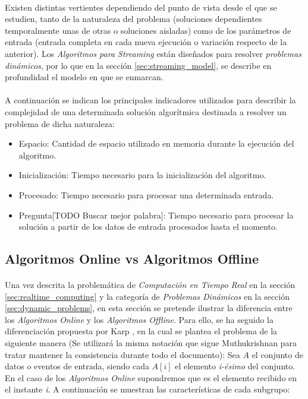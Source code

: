 \documentclass{subfiles}
\begin{document}
        \paragraph{}
        Existen distintas vertientes dependiendo del punto de vista desde el que se estudien, tanto de la naturaleza del problema (soluciones dependientes temporalmente unas de otras o soluciones aisladas) como de los parámetros de entrada (entrada completa en cada nueva ejecución o variación respecto de la anterior). Los \emph{Algoritmos para Streaming} están diseñados para resolver \emph{problemas dinámicos}, por lo que en la sección \ref{sec:streaming_model}, se describe en profundidad el modelo en que se enmarcan.

        \paragraph{}
        A continuación se indican los principales indicadores utilizados para describir la complejidad de una determinada solución algorítmica destinada a resolver un problema de dicha naturaleza:

        \begin{itemize}
          \item Espacio: Cantidad de espacio utilizado en memoria durante la ejecución del algoritmo.
          \item Inicialización: Tiempo necesario para la inicialización del algoritmo.
          \item Procesado: Tiempo necesario para procesar una determinada entrada.
          \item Pregunta[TODO Buscar mejor palabra]: Tiempo necesario para procesar la solución a partir de los datos de entrada procesados hasta el momento.
        \end{itemize}


      \subsection{Algoritmos Online vs Algoritmos Offline}

        \paragraph{}
        Una vez descrita la problemática de \emph{Computación en Tiempo Real} en la sección \ref{sec:realtime_computing} y la categoría de \emph{Problemas Dinámicos} en la sección \ref{sec:dynamic_problems}, en esta sección se pretende ilustrar la diferencia entre los \emph{Algoritmos Online} y los \emph{Algoritmos Offline}. Para ello, se ha seguido la diferenciación propuesta por Karp \cite{Karp:1992:OAV:645569.659725}, en la cual se plantea el problema de la siguiente manera (Se utilizará la misma notación que sigue Muthukrishnan\cite{Muthukrishnan:2005:DSA:1166409.1166410} para tratar mantener la consistencia durante todo el documento): Sea $A$ el conjunto de datos o eventos de entrada, siendo cada $A[i]$ el elemento \emph{i-ésimo} del conjunto. En el caso de los \emph{Algoritmos Online} supondremos que es el elemento recibido en el instante \emph{i}. A continuación se muestran las características de cada subgrupo:
\end{document}
